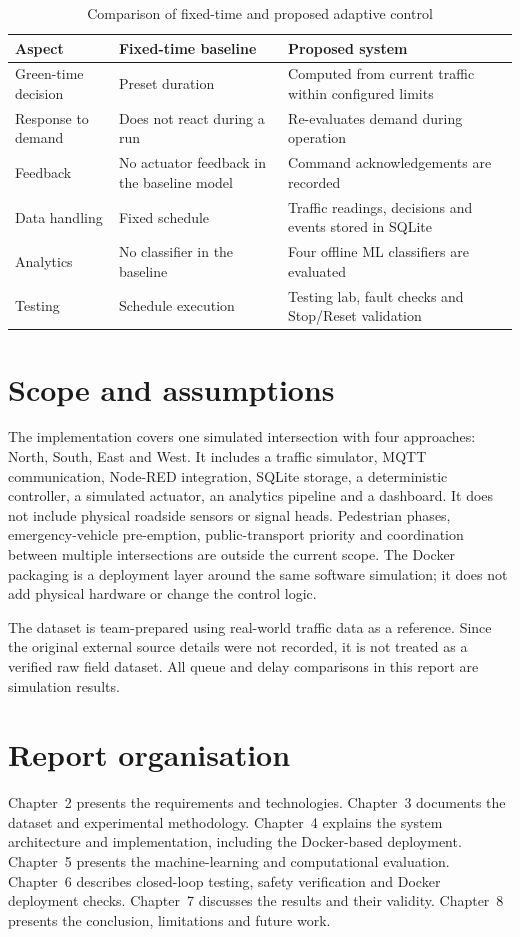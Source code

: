 \documentclass[12pt,a4paper,oneside]{report}
\begin{document}
\begin{table}[htbp]\centering\small
\caption{Comparison of fixed-time and proposed adaptive control}\label{tab:exist-vs-proposed}
\begin{tabular}{|p{}|p{}|p{}|}\hline
\textbf{Aspect} & \textbf{Fixed-time baseline} & \textbf{Proposed system} \\\hline
Green-time decision & Preset duration & Computed from current traffic within configured limits \\\hline
Response to demand & Does not react during a run & Re-evaluates demand during operation \\\hline
Feedback & No actuator feedback in the baseline model & Command acknowledgements are recorded \\\hline
Data handling & Fixed schedule & Traffic readings, decisions and events stored in SQLite \\\hline
Analytics & No classifier in the baseline & Four offline ML classifiers are evaluated \\\hline
Testing & Schedule execution & Testing lab, fault checks and Stop/Reset validation \\\hline
\end{tabular}\end{table}

\section{Scope and assumptions}
The implementation covers one simulated intersection with four approaches: North, South, East and West. It includes a traffic simulator, MQTT communication, Node-RED integration, SQLite storage, a deterministic controller, a simulated actuator, an analytics pipeline and a dashboard. It does not include physical roadside sensors or signal heads. Pedestrian phases, emergency-vehicle pre-emption, public-transport priority and coordination between multiple intersections are outside the current scope. The Docker packaging is a deployment layer around the same software simulation; it does not add physical hardware or change the control logic.

The dataset is team-prepared using real-world traffic data as a reference. Since the original external source details were not recorded, it is not treated as a verified raw field dataset. All queue and delay comparisons in this report are simulation results.

\section{Report organisation}
Chapter~2 presents the requirements and technologies. Chapter~3 documents the dataset and experimental methodology. Chapter~4 explains the system architecture and implementation, including the Docker-based deployment. Chapter~5 presents the machine-learning and computational evaluation. Chapter~6 describes closed-loop testing, safety verification and Docker deployment checks. Chapter~7 discusses the results and their validity. Chapter~8 presents the conclusion, limitations and future work.
\end{document}
